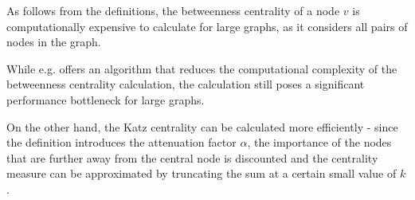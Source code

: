 \begin{mybox}{}
As follows from the definitions, the betweenness centrality of a node $v$ is computationally expensive 
to calculate for large graphs, as it considers all pairs of nodes in the graph.

While e.g. \cite{brandes-faster-centrality} offers an algorithm that reduces the computational complexity of the betweenness centrality calculation,
the calculation still poses a significant performance bottleneck for large graphs.

On the other hand, the Katz centrality can be calculated more efficiently - since the definition introduces 
the attenuation factor $\alpha$, the importance of the nodes that are further away from the central node is discounted
and the centrality measure can be approximated by truncating the sum at a certain small value of $k$.
\end{mybox}
